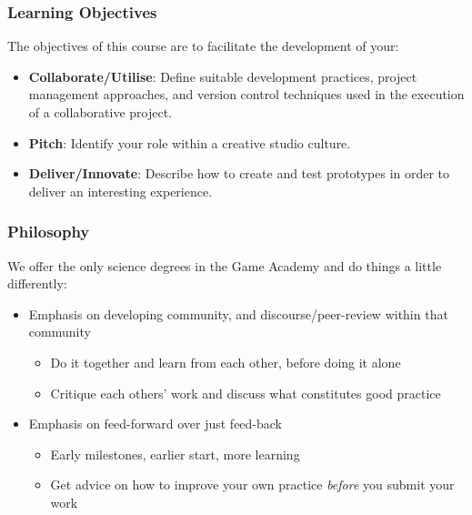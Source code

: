 \begin{frame}
	\frametitle{Learning Objectives}
	
	The objectives of this course are to facilitate the development of your:
	
	\begin{itemize}
		\item \textbf{Collaborate/Utilise}: Define suitable development practices, project management approaches, and version control techniques used in the execution of a collaborative project. \pause
		\item \textbf{Pitch}: Identify your role within a creative studio culture. \pause
		\item \textbf{Deliver/Innovate}: Describe how to create and test prototypes in order to deliver an interesting experience.
	\end{itemize}
\end{frame}

\begin{frame}
	\frametitle{Philosophy}
	
	We offer the only science degrees in the Game Academy and do things a little differently:
	
	\begin{itemize}
		\pause\item Emphasis on developing community, and discourse/peer-review within that community
		\begin{itemize}
			\item Do it together and learn from each other, before doing it alone
			\item Critique each others' work and discuss what constitutes good practice
		\end{itemize}
		\pause\item Emphasis on feed-forward over just feed-back
		\begin{itemize}
			\item Early milestones, earlier start, more learning
			\item Get advice on how to improve your own practice \textit{before} you submit your work
		\end{itemize}
	\end{itemize}
\end{frame}

